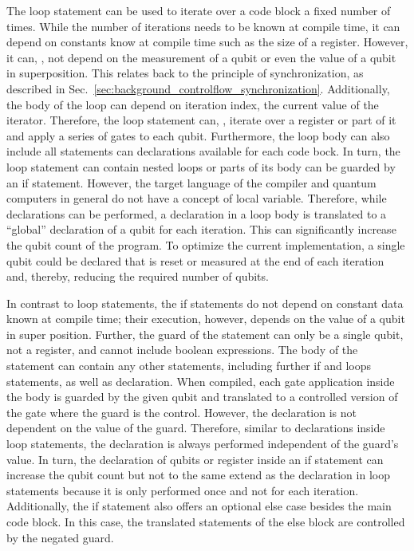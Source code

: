 The loop statement can be used to iterate over a code block a fixed number of times. While the number of iterations needs to be known at compile time, it can depend on constants know at compile time such as the size of a register. However, it can, \eg, not depend on the measurement of a qubit or even the value of a qubit in superposition. This relates back to the principle of synchronization, as described in Sec.~\ref{sec:background_controlflow_synchronization}. Additionally, the body of the loop can depend on iteration index, \ie the current value of the iterator. Therefore, the loop statement can, \eg, iterate over a register or part of it and apply a series of gates to each qubit. Furthermore, the loop body can also include all statements can declarations available for each code bock. In turn, the loop statement can contain nested loops or parts of its body can be guarded by an if statement. However, the target language of the compiler and quantum computers in general do not have a concept of local variable. Therefore, while declarations can be performed, a declaration in a loop body is translated to a ``global'' declaration of a qubit for each iteration. This can significantly increase the qubit count of the program. To optimize the current implementation, a single qubit could be declared that is reset or measured at the end of each iteration and, thereby, reducing the required number of qubits.

In contrast to loop statements, the if statements do not depend on constant data known at compile time; their execution, however, depends on the value of a qubit in super position. Further, the guard of the statement can only be a single qubit, not a register, and cannot include boolean expressions.
The body of the statement can contain any other statements, including further if and loops statements, as well as declaration. When compiled, each gate application inside the body is guarded by the given qubit and translated to a controlled version of the gate where the guard is the control. However, the declaration is not dependent on the value of the guard. Therefore, similar to declarations inside loop statements, the declaration is always performed independent of the guard's value. In turn, the declaration of qubits or register inside an if statement can increase the qubit count but not to the same extend as the declaration in loop statements because it is only performed once and not for each iteration. Additionally, the if statement also offers an optional else case besides the main code block. In this case, the translated statements of the else block are controlled by the negated guard. 

